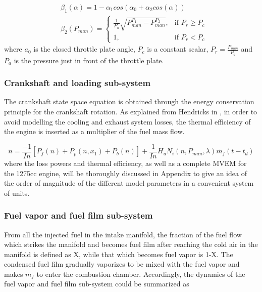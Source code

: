 \begin{align}
&\beta_{1}(\alpha) =1-\alpha_{1} cos(\alpha_{0}+\alpha_{2} cos(\alpha))
\\
&\beta_{2}(P_{man}) = \begin{cases} \frac{1}{P_{n}}\sqrt{P_{man}^{P_{1}}-P_{man}^{P_{2}}}, & \mbox{if } P_{r} \geq P_{c} \\ 1, & \mbox{if } P_{r} < P_{c} \end{cases}
\end{align}
where $a_{0}$ is the closed throttle plate angle, $P_{c}$ is a constant scalar, $P_{r}=\displaystyle\frac{P_{man}}{P_{a}}$ and $P_{a}$ is the pressure just in front of the throttle plate.

\subsubsection{Crankshaft and loading sub-system}

The crankshaft state space equation is obtained through the energy conservation principle for the crankshaft rotation. As explained from Hendricks in \cite{hendricks1990mean}, in order to avoid modelling the cooling and exhaust system losses, the thermal efficiency of the engine is inserted as a multiplier of the fuel mass flow.

\begin{equation}
\dot{n}=\frac{-1}{In}[P_{f}(n)+P_{p}(n,x_{1})+P_{b}(n)]+\frac{1}{In}H_{u}N_{i}(n,P_{man},\lambda)\dot{m_{f}}(t-t_{d})
\end{equation}
where the loss powers and thermal efficiency, as well as a complete MVEM for the 1275cc engine, will be thoroughly discussed in Appendix to give an idea of the order of magnitude of the different model parameters in a convenient system of units. 


\subsubsection{Fuel vapor and fuel film sub-system}

From all the injected fuel in the intake manifold, the fraction of the fuel flow which strikes the manifold and becomes fuel film after reaching the cold air in the manifold is defined as X, while that which becomes fuel vapor is 1-X. The condensed fuel film gradually vaporizes to be mixed with the fuel vapor and makes $\dot{m_{f}}$ to enter the combustion chamber. Accordingly, the dynamics of the fuel vapor and fuel film sub-system could be summarized as



